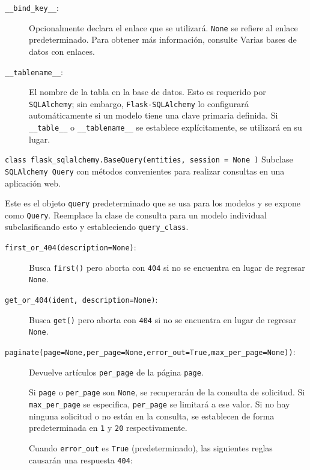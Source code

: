 \documentclass[11pt,letterpaper,notumble]{leaflet}
\begin{document}
{\begin{minipage}{2.2\linewidth}
            \begin{description}
            	\item[\texttt{\_\_bind\_key\_\_}:] Opcionalmente declara el enlace que se utilizará. \texttt{None} se refiere al enlace predeterminado. Para obtener más información, consulte Varias bases de datos con enlaces.
            	
            	\item[\texttt{\_\_tablename\_\_}:]
            	El nombre de la tabla en la base de datos. Esto es requerido por \texttt{SQLAlchemy}; sin embargo, \texttt{Flask-SQLAlchemy} lo configurará automáticamente si un modelo tiene una clave primaria definida. Si \texttt{\_\_table\_\_} o \texttt{\_\_tablename\_\_} se establece explícitamente, se utilizará en su lugar.
            \end{description}
        
            \texttt{class flask\_sqlalchemy.BaseQuery(entities, session = None )} 
            Subclase \texttt{SQLAlchemy Query} con métodos convenientes para realizar consultas en una aplicación web.
            
            Este es el objeto \texttt{query} predeterminado que se usa para los modelos y se expone como \texttt{Query}. Reemplace la clase de consulta para un modelo individual subclasificando esto y estableciendo \texttt{query\_class}.
            
            \begin{description}
            	\item[\texttt{first\_or\_404(description=None)}:] Busca \texttt{first()} pero aborta con \texttt{404} si no se encuentra en lugar de regresar \texttt{None}.
            	\item[\texttt{get\_or\_404(ident, description=None)}:] Busca \texttt{get()} pero aborta con \texttt{404} si no se encuentra en lugar de regresar \texttt{None}.
            	\item[\texttt{paginate(page=None,per\_page=None,error\_out=True,max\_per\_page=None))}:] Devuelve artículos \texttt{per\_page} de la página \texttt{page}.
            	
            	Si \texttt{page} o \texttt{per\_page} son \texttt{None}, se recuperarán de la consulta de solicitud. Si \texttt{max\_per\_page} se especifica, \texttt{per\_page} se limitará a ese valor. Si no hay ninguna solicitud o no están en la consulta, se establecen de forma predeterminada en \texttt{1} y \texttt{20} respectivamente.
            	
            	Cuando \texttt{error\_out} es \texttt{True} (predeterminado), las siguientes reglas causarán una respuesta \texttt{404}:
            \end{description}
            
        \end{minipage}
    
    }
\end{document}
